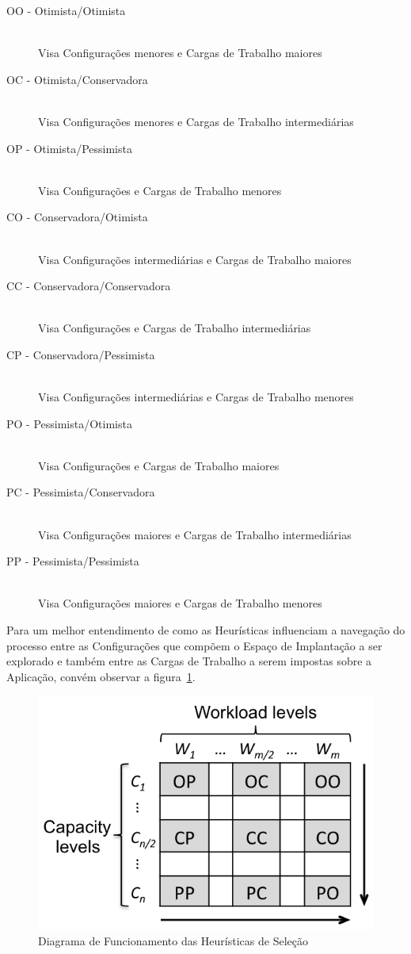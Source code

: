 \begin{description}
  \item[OO - Otimista/Otimista] \hfill \\ Visa Configurações menores e Cargas de Trabalho maiores
  \item[OC - Otimista/Conservadora] \hfill \\ Visa Configurações menores e Cargas de Trabalho intermediárias
  \item[OP - Otimista/Pessimista] \hfill \\ Visa Configurações e Cargas de Trabalho menores
  \item[CO - Conservadora/Otimista] \hfill \\ Visa Configurações intermediárias e Cargas de Trabalho maiores
  \item[CC - Conservadora/Conservadora] \hfill \\ Visa Configurações e Cargas de Trabalho intermediárias
  \item[CP - Conservadora/Pessimista] \hfill \\ Visa Configurações intermediárias e Cargas de Trabalho menores
  \item[PO - Pessimista/Otimista] \hfill \\ Visa Configurações e Cargas de Trabalho maiores
  \item[PC - Pessimista/Conservadora] \hfill \\ Visa Configurações maiores e Cargas de Trabalho intermediárias
  \item[PP - Pessimista/Pessimista] \hfill \\ Visa Configurações maiores e Cargas de Trabalho menores
\end{description}

Para um melhor entendimento de como as Heurísticas influenciam a navegação do 
processo entre as Configurações que compõem o Espaço de Implantação a ser explorado
e também entre as Cargas de Trabalho a serem impostas sobre a Aplicação, convém
observar a figura~\ref{fig:heuristicas}.

\begin{figure}
  \caption{\label{fig:heuristicas}Diagrama de Funcionamento das Heurísticas de Seleção}
  \begin{center}
    \includegraphics[scale=1]{img/heuristics}
  \end{center}
\end{figure}

